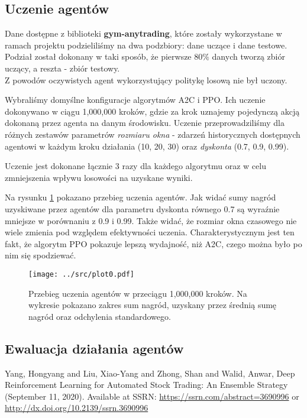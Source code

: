 \documentclass[12pt,a4paper]{article}
\begin{document}
\subsection{Uczenie agentów}

Dane dostępne z biblioteki \textbf{gym-anytrading}, które zostały wykorzystane
w ramach projektu podzieliliśmy na dwa podzbiory: dane uczące i dane testowe.
Podział został dokonany w taki sposób, że pierwsze $80\%$ danych tworzą
zbiór uczący, a reszta - zbiór testowy. \\

Z powodów oczywistych agent wykorzystujący politykę losową nie był uczony.
\smallskip

Wybraliśmy domyślne konfiguracje algorytmów A2C i PPO.
Ich uczenie dokonywano w ciągu 1,000,000 kroków,
gdzie za krok uznajemy pojedynczą akcją dokonaną przez
agenta na danym środowisku. Uczenie przeprowadziliśmy dla różnych zestawów
parametrów \emph{rozmiaru okna} - zdarzeń historycznych dostępnych agentowi
w każdym kroku działania (10, 20, 30) oraz \emph{dyskonta} (0.7, 0.9, 0.99).

Uczenie jest dokonane łącznie 3 razy
dla każdego algorytmu oraz w celu zmniejszenia wpływu
losowości na uzyskane wyniki.

Na rysunku \ref{fig:training} pokazano przebieg uczenia agentów.
Jak widać sumy nagród uzyskiwane przez agentów dla parametru dyskonta
równego 0.7 są wyraźnie mniejsze w porównaniu z 0.9 i 0.99. Także widać, że
rozmiar okna czasowego nie wiele zmienia pod względem efektywności uczenia.
Charakterystycznym jest ten fakt, że algorytm PPO pokazuje lepszą wydajność,
niż A2C, czego można było po nim się spodziewać.

\begin{figure}[!h]
  \centering
  \texttt{[image: ../src/plot0.pdf]}
  \caption{Przebieg uczenia agentów w przeciągu 1,000,000 kroków.
    Na wykresie pokazano zakres sum nagród, uzyskany przez
    średnią sumę nagród oraz odchylenia standardowego.}
  \label{fig:training}
\end{figure}

\subsection{Ewaluacja działania agentów}


\pagebreak
\begin{thebibliography}{9}
  Yang, Hongyang and Liu, Xiao-Yang and Zhong, Shan and Walid, Anwar,
  Deep Reinforcement Learning for Automated Stock Trading: An Ensemble
  Strategy (September 11, 2020). Available at SSRN:
  \href{https://ssrn.com/abstract=3690996}{https://ssrn.com/abstract=3690996}
  or \href{http://dx.doi.org/10.2139/ssrn.3690996}{http://dx.doi.org/10.2139/ssrn.3690996}
\end{thebibliography}
\end{document}
